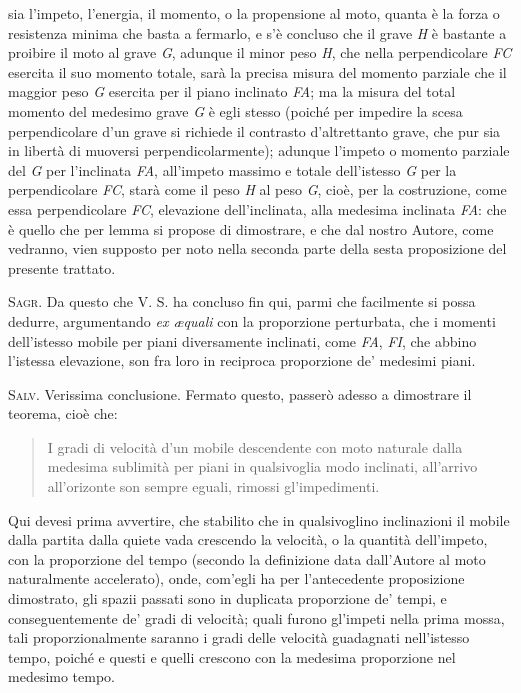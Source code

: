 \documentclass[11pt,twoside,openany]{book}
\newcommand{\speaker}[1]{\textcolor{rubric}{\textsc{#1}}\space}
\newenvironment{enunciato}{%
  \begin{quote}\itshape%
}{%
  \end{quote}%
}
\begin{document}
sia l'impeto, l'energia, il momento, o la propensione al moto, quanta è la forza o resistenza minima che basta a fermarlo, e s'è concluso che il grave \emph{H} è bastante a proibire il moto al grave \emph{G}, adunque il minor peso \emph{H}, che nella perpendicolare \emph{FC} esercita il suo momento totale, sarà la precisa misura del momento parziale che il maggior peso \emph{G} esercita per il piano inclinato \emph{FA}; ma la misura del total momento del medesimo grave \emph{G} è egli stesso (poiché per impedire la scesa perpendicolare d'un grave si richiede il contrasto d'altrettanto grave, che pur sia in libertà di muoversi perpendicolarmente); adunque l'impeto o momento parziale del \emph{G} per l'inclinata \emph{FA}, all'impeto massimo e totale dell'istesso \emph{G} per la perpendicolare \emph{FC}, starà come il peso \emph{H} al peso \emph{G}, cioè, per la costruzione, come essa perpendicolare \emph{FC}, elevazione dell'inclinata, alla medesima inclinata \emph{FA}: che è quello che per lemma si propose di dimostrare, e che dal nostro Autore, come vedranno, vien supposto per noto nella seconda parte della sesta proposizione del presente trattato.

\speaker{Sagr.} Da questo che V. S. ha concluso fin qui, parmi che facilmente si possa dedurre, argumentando \emph{ex æquali} con la proporzione perturbata, che i momenti dell'istesso mobile per piani diversamente inclinati, come \emph{FA}, \emph{FI}, che abbino l'istessa elevazione, son fra loro in reciproca proporzione de' medesimi piani.

\speaker{Salv.} Verissima conclusione. Fermato questo, passerò adesso a dimostrare il teorema, cioè che:


\begin{enunciato}
I gradi di velocità d'un mobile descendente con moto naturale dalla medesima sublimità per piani in qualsivoglia modo inclinati, all'arrivo all'orizonte son sempre eguali, rimossi gl'impedimenti.
\end{enunciato}

Qui devesi prima avvertire, che stabilito che in qualsivoglino inclinazioni il mobile dalla partita dalla quiete vada crescendo la velocità, o la quantità dell'impeto, con la proporzione del tempo (secondo la definizione data dall'Autore al moto naturalmente accelerato), onde, com'egli ha per l'antecedente proposizione dimostrato, gli spazii passati sono in duplicata proporzione de' tempi, e conseguentemente de' gradi di velocità; quali furono gl'impeti nella prima mossa, tali proporzionalmente saranno i gradi delle velocità guadagnati nell'istesso tempo, poiché e questi e quelli crescono con la medesima proporzione nel medesimo tempo.
\end{document}
